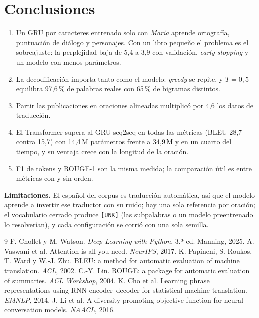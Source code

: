 \documentclass[12pt,a4paper]{article}
\begin{document}
\section{Conclusiones}

\begin{enumerate}\setlength{\itemsep}{0pt}
  \item Un GRU por caracteres entrenado solo con \emph{María} aprende ortografía, puntuación de diálogo y
    personajes. Con un libro pequeño el problema es el sobreajuste: la perplejidad baja de 5,4 a 3,9 con
    validación, \emph{early stopping} y un modelo con menos parámetros.
  \item La decodificación importa tanto como el modelo: \emph{greedy} se repite, y $T=0{,}5$ equilibra
    97,6\,\% de palabras reales con 65\,\% de bigramas distintos.
  \item Partir las publicaciones en oraciones alineadas multiplicó por 4,6 los datos de traducción.
  \item El Transformer supera al GRU seq2seq en todas las métricas (BLEU 28,7 contra 15,7) con 14,4\,M
    parámetros frente a 34,9\,M y en un cuarto del tiempo, y su ventaja crece con la longitud de la oración.
  \item F1 de tokens y ROUGE-1 son la misma medida; la comparación útil es entre métricas con y sin orden.
\end{enumerate}

\textbf{Limitaciones.} El español del corpus es traducción automática, así que el modelo aprende a invertir
ese traductor con su ruido; hay una sola referencia por oración; el vocabulario cerrado produce \texttt{[UNK]}
(las subpalabras o un modelo preentrenado lo resolverían), y cada configuración se corrió con una sola semilla.

\begin{thebibliography}{9}\small
{} F. Chollet y M. Watson. \emph{Deep Learning with Python}, 3.ª ed. Manning, 2025.
 A. Vaswani et al. Attention is all you need. \emph{NeurIPS}, 2017.
 K. Papineni, S. Roukos, T. Ward y W.-J. Zhu. BLEU: a method for automatic evaluation of machine translation. \emph{ACL}, 2002.
 C.-Y. Lin. ROUGE: a package for automatic evaluation of summaries. \emph{ACL Workshop}, 2004.
 K. Cho et al. Learning phrase representations using RNN encoder--decoder for statistical machine translation. \emph{EMNLP}, 2014.
 J. Li et al. A diversity-promoting objective function for neural conversation models. \emph{NAACL}, 2016.
\end{thebibliography}
\end{document}
